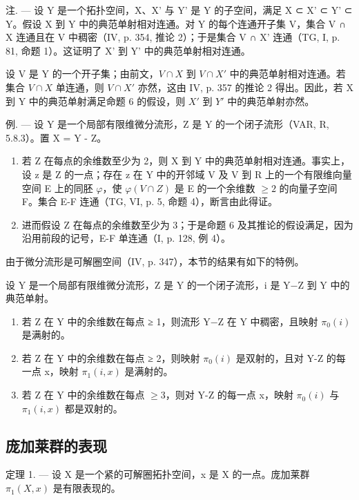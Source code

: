注. --- 设 Y 是一个拓扑空间，X、X' 与 Y' 是 Y 的子空间，满足 X ⊂ X' ⊂ Y' ⊂ Y。假设 X 到 Y 中的典范单射相对连通。对 Y 的每个连通开子集 V，集合 V ∩ X 连通且在 V 中稠密（IV, p. 354, 推论 2）；于是集合 V ∩ X' 连通（TG, I, p. 81, 命题 1）。这证明了 X' 到 Y' 中的典范单射相对连通。

设 V 是 Y 的一个开子集；由前文，\(V \cap X\) 到 \(V \cap X'\) 中的典范单射相对连通。若集合 \(V \cap X\) 单连通，则 \(V \cap X'\) 亦然，这由 IV, p. 357 的推论 2 得出。因此，若 X 到 Y 中的典范单射满足命题 6 的假设，则 \(X'\) 到 \(Y'\) 中的典范单射亦然。

例. --- 设 Y 是一个局部有限维微分流形，Z 是 Y 的一个闭子流形（VAR, R, 5.8.3）。置 X = Y - Z。

\begin{enumerate}
\def\labelenumi{\alph{enumi})}
\item
  若 Z 在每点的余维数至少为 2，则 X 到 Y 中的典范单射相对连通。事实上，设 z 是 Z 的一点；存在 z 在 Y 中的开邻域 V 及 V 到 R 上的一个有限维向量空间 E 上的同胚 \(\varphi\)，使 \(\varphi(V \cap Z)\) 是 E 的一个余维数 \(\geqslant 2\) 的向量子空间 F。集合 E-F 连通（TG, VI, p. 5, 命题 4），断言由此得证。
\item
  进而假设 Z 在每点的余维数至少为 3；于是命题 6 及其推论的假设满足，因为沿用前段的记号，E-F 单连通（I, p. 128, 例 4）。
\end{enumerate}

由于微分流形是可解圈空间（IV, p. 347），本节的结果有如下的特例。

设 Y 是一个局部有限维微分流形，Z 是 Y 的一个闭子流形，i 是 Y−Z 到 Y 中的典范单射。

\begin{enumerate}
\def\labelenumi{\alph{enumi})}
\item
  若 Z 在 Y 中的余维数在每点 ≥ 1，则流形 Y−Z 在 Y 中稠密，且映射 \(\pi_{0}(i)\) 是满射的。
\item
  若 Z 在 Y 中的余维数在每点 ≥ 2，则映射 \(\pi_{0}(i)\) 是双射的，且对 Y-Z 的每一点 x，映射 \(\pi_{1}(i,x)\) 是满射的。
\item
  若 Z 在 Y 中的余维数在每点 \(\geqslant 3\)，则对 Y-Z 的每一点 x，映射 \(\pi_{0}(i)\) 与 \(\pi_{1}(i,x)\) 都是双射的。
\end{enumerate}

\subsection{庞加莱群的表现}

定理 1. --- 设 X 是一个紧的可解圈拓扑空间，x 是 X 的一点。庞加莱群 \(\pi_{1}(X,x)\) 是有限表现的。


